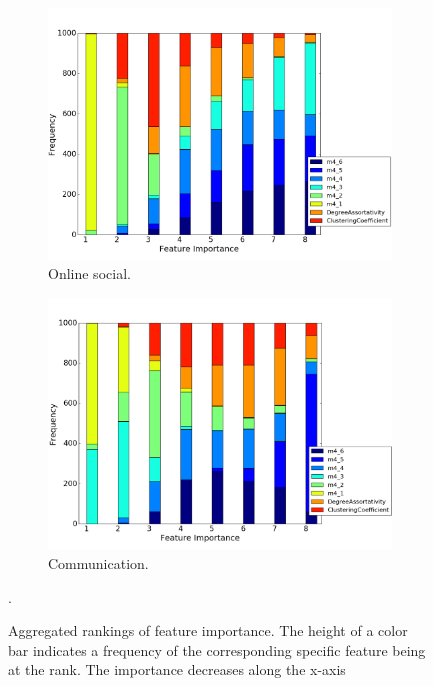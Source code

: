 \begin{figure}[H]
\medskip
\begin{subfigure}{0.48\textwidth}
\includegraphics[width=\linewidth]{figs/one_by_many/online_social/feature_importance.png}
\caption{Online social.} \label{online_social_feature}
\end{subfigure}\hspace*{\fill}
\begin{subfigure}{0.48\textwidth}
\includegraphics[width=\linewidth]{figs/one_by_many/communication/feature_importance.png}
\caption{Communication.} \label{communication_feature}
\end{subfigure}

\caption{Aggregated rankings of feature importance. The height of a color bar indicates a frequency of the corresponding specific feature being at the rank. The importance decreases along the x-axis} \label{feature_importance_figures}.
\end{figure}


